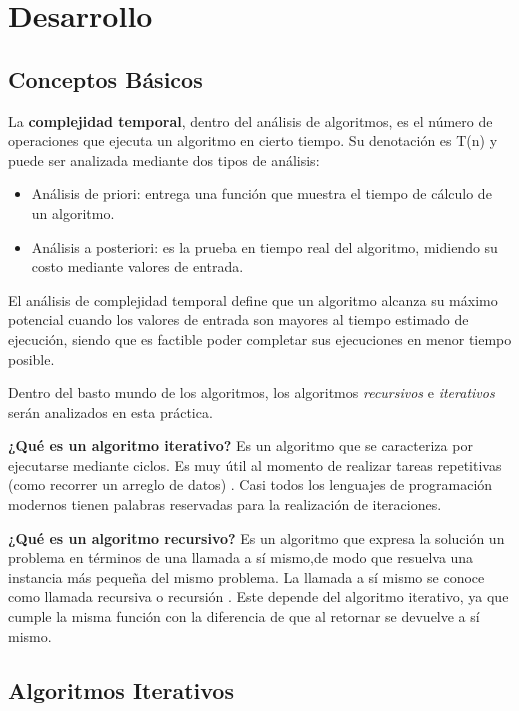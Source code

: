 \chapter{Desarrollo}

\section{Conceptos Básicos}
    La \textbf{complejidad temporal}, dentro del análisis de algoritmos, es el número de operaciones que ejecuta un algoritmo en cierto tiempo. Su denotación es T(n) y puede ser analizada mediante dos tipos de análisis:
    
    \begin{itemize}
        \item Análisis de priori: entrega una función que muestra el tiempo de cálculo de un algoritmo.
        \item Análisis a posteriori: es la prueba en tiempo real del algoritmo, midiendo su costo mediante valores de entrada. 
    \end{itemize}
    
    El análisis de complejidad temporal define que un algoritmo alcanza su máximo potencial cuando los valores de entrada son mayores al tiempo estimado de ejecución, siendo que es factible poder completar sus ejecuciones en menor tiempo posible. 
    
    Dentro del basto mundo de los algoritmos, los algoritmos \textit{recursivos} e \textit{iterativos} serán analizados en esta práctica. 
    
    \textbf{¿Qué es un algoritmo iterativo?} Es un algoritmo que se caracteriza por ejecutarse mediante ciclos. Es muy útil al momento de realizar tareas repetitivas (como recorrer un arreglo de datos) \cite{iterativo}. Casi todos los lenguajes de programación modernos tienen palabras reservadas para la realización de iteraciones.
    
    \textbf{¿Qué es un algoritmo recursivo?} Es un algoritmo que expresa la solución un problema en términos de una llamada a sí mismo,de modo que resuelva una instancia más pequeña del mismo problema. La llamada a sí mismo se conoce como llamada recursiva o recursión \cite{recursivo}. Este depende del algoritmo iterativo, ya que cumple la misma función con la diferencia de que al retornar se devuelve a sí mismo. 
    
    
    
    
\newpage
\section{Algoritmos Iterativos}

